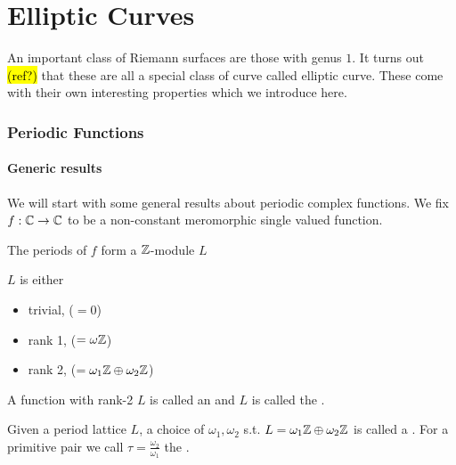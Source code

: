 \documentclass{article}
\begin{document}
\part{Elliptic Curves}
An important class of Riemann surfaces are those with genus $1$. It turns out \hl{(ref?)} that these are all a special class of curve called elliptic curve. These come with their own interesting properties which we introduce here. 


\section{Periodic Functions}

\subsection{Generic results}

We will start with some general results about periodic complex functions. We fix $f:\mathbb{C} \to \mathbb{C}$ to be a non-constant meromorphic single valued function. 

\begin{lemma}
	The periods of $f$ form a $\mathbb{Z}$-module $L$ 
\end{lemma}

\begin{prop}
	$L$ is either 
	\begin{itemize}
		\item trivial, ($=0$)
		\item rank 1, ($=\omega \mathbb{Z}$)
		\item rank 2, ($=\omega_1 \mathbb{Z} \oplus \omega_2 \mathbb{Z}$)
	\end{itemize}
\end{prop}

\begin{definition}
	A function with rank-2 $L$ is called an  and $L$ is called the . 
\end{definition}

\begin{definition}
	Given a period lattice $L$, a choice of $\omega_1, \omega_2$ s.t.  $L = \omega_1 \mathbb{Z} \oplus \omega_2 \mathbb{Z}$ is called a . For a primitive pair we call $\tau = \frac{\omega_2}{\omega_1}$ the . 
\end{definition}
\end{document}
